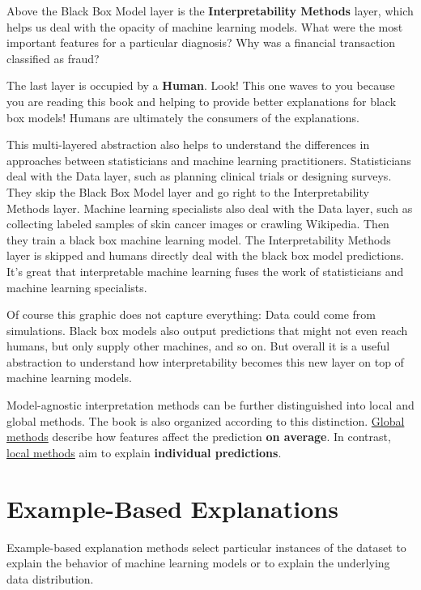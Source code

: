 \documentclass[
  12pt,
]{krantz}
\begin{document}
Above the Black Box Model layer is the \textbf{Interpretability Methods} layer, which helps us deal with the opacity of machine learning models.
What were the most important features for a particular diagnosis?
Why was a financial transaction classified as fraud?

The last layer is occupied by a \textbf{Human}.
Look! This one waves to you because you are reading this book and helping to provide better explanations for black box models!
Humans are ultimately the consumers of the explanations.

This multi-layered abstraction also helps to understand the differences in approaches between statisticians and machine learning practitioners.
Statisticians deal with the Data layer, such as planning clinical trials or designing surveys.
They skip the Black Box Model layer and go right to the Interpretability Methods layer.
Machine learning specialists also deal with the Data layer, such as collecting labeled samples of skin cancer images or crawling Wikipedia.
Then they train a black box machine learning model.
The Interpretability Methods layer is skipped and humans directly deal with the black box model predictions.
It's great that interpretable machine learning fuses the work of statisticians and machine learning specialists.

Of course this graphic does not capture everything:
Data could come from simulations.
Black box models also output predictions that might not even reach humans, but only supply other machines, and so on.
But overall it is a useful abstraction to understand how interpretability becomes this new layer on top of machine learning models.

Model-agnostic interpretation methods can be further distinguished into local and global methods.
The book is also organized according to this distinction.
\protect\hyperlink{global-methods}{Global methods} describe how features affect the prediction \textbf{on average}.
In contrast, \protect\hyperlink{local-methods}{local methods} aim to explain \textbf{individual predictions}.

\hypertarget{example-based}{%
\chapter{Example-Based Explanations}\label{example-based}}

Example-based explanation methods select particular instances of the dataset to explain the behavior of machine learning models or to explain the underlying data distribution.
\end{document}
